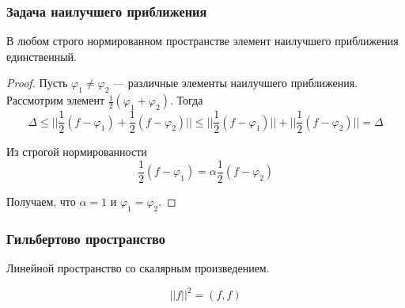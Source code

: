 \documentclass[10pt]{beamer}
\begin{document}
\begin{frame}[fragile]
\frametitle{Задача наилучшего приближения}

\begin{theorem}
В любом строго нормированном пространстве элемент наилучшего приближения единственный.
\end{theorem}

\begin{proof}
Пусть $\varphi_1 \neq \varphi_2$ --- различные элементы наилучшего приближения. Рассмотрим элемент $\frac12 (\varphi_1 + \varphi_2)$. Тогда 
$$\Delta \leqslant ||\frac12 (f - \varphi_1)  + \frac12 (f - \varphi_2)|| \leqslant ||\frac12 (f - \varphi_1)|| + ||\frac12 (f - \varphi_2)|| = \Delta$$

Из строгой нормированности
$$\frac12 (f - \varphi_1) = \alpha \frac12 (f - \varphi_2)$$

Получаем, что $\alpha = 1$ и $\varphi_1 = \varphi_2$.
\end{proof}
\end{frame}

\begin{frame}[fragile]
\frametitle{Гильбертово пространство}

Линейной пространство со скалярным произведением.

\vfill

$$||f||^2 = (f, f)$$

\end{frame}
\end{document}
